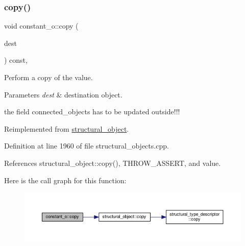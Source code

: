 \subsubsection{\texorpdfstring{copy()}{copy()}}
{\footnotesize\ttfamily void constant\+\_\+o\+::copy (\begin{DoxyParamCaption}\item[{\hyperlink{structural__objects_8hpp_a8ea5f8cc50ab8f4c31e2751074ff60b2}{structural\+\_\+object\+Ref}}]{dest }\end{DoxyParamCaption}) const\hspace{0.3cm}{\ttfamily [override]}, {\ttfamily [virtual]}}



Perform a copy of the value. 


\begin{DoxyParams}{Parameters}
{\em dest} & destination object. \\
\hline
\end{DoxyParams}
the field connected\+\_\+objects has to be updated outside!!! 

Reimplemented from \hyperlink{classstructural__object_a6566435c67934f6b4ff1b319c0682b18}{structural\+\_\+object}.



Definition at line 1960 of file structural\+\_\+objects.\+cpp.



References structural\+\_\+object\+::copy(), T\+H\+R\+O\+W\+\_\+\+A\+S\+S\+E\+RT, and value.

Here is the call graph for this function\+:
\nopagebreak
\begin{figure}[H]
\begin{center}
\leavevmode
\includegraphics[width=350pt]{d4/d65/classconstant__o_a658c0b11683baa33746bb8ed5e0f238c_cgraph}
\end{center}
\end{figure}
\mbox{\label{classconstant__o_aa4bf7187d16113ee8a90b2758e03f6b5}} 
